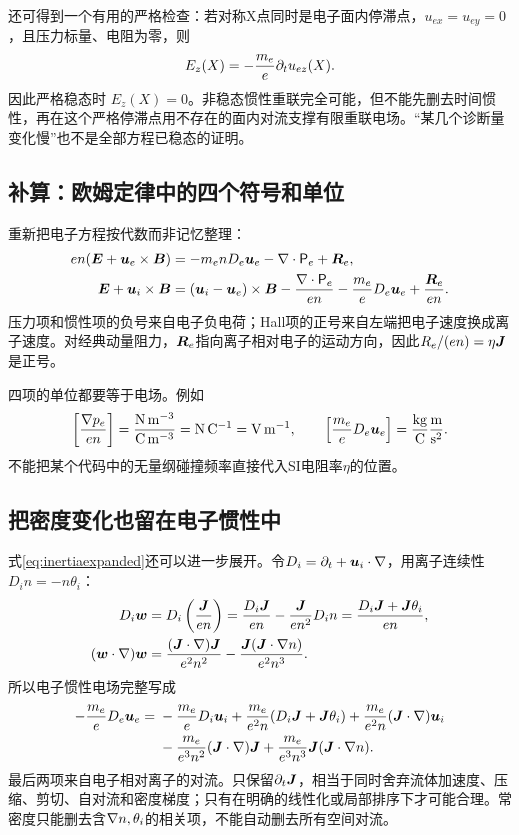 \documentclass[UTF8,a4paper,11pt,openany,fontset=fandol]{ctexbook}
\begin{document}
还可得到一个有用的严格检查：若对称X点同时是电子面内停滞点，$u_{ex}=u_{ey}=0$，且压力标量、电阻为零，则
\begin{equation}E_z(X)=-{m_e\over e}\partial_tu_{ez}(X).
\end{equation}
因此严格稳态时 $E_z(X)=0$。非稳态惯性重联完全可能，但不能先删去时间惯性，再在这个严格停滞点用不存在的面内对流支撑有限重联电场。“某几个诊断量变化慢”也不是全部方程已稳态的证明。

\subsection{补算：欧姆定律中的四个符号和单位}
重新把电子方程按代数而非记忆整理：
\begin{align}
 en(\bm{E}+\bm{u}_e\times\bm{B})
 &=-m_enD_e\bm{u}_e-\nabla\cdot\mathsf P_e+\bm{R}_e,\\
 \bm{E}+\bm{u}_i\times\bm{B}
 &=(\bm{u}_i-\bm{u}_e)\times\bm{B}
   -{\nabla\cdot\mathsf P_e\over en}-{m_e\over e}D_e\bm{u}_e
   +{\bm{R}_e\over en}.
\end{align}
压力项和惯性项的负号来自电子负电荷；Hall项的正号来自左端把电子速度换成离子速度。对经典动量阻力，$\bm{R}_e$指向离子相对电子的运动方向，因此$R_e/(en)=\eta\bm{J}$是正号。

四项的单位都要等于电场。例如
\begin{equation}
 \left[{\nabla p_e\over en}\right]
 ={{\rm N\,m^{-3}}\over{\rm C\,m^{-3}}}
 ={\rm N\,C^{-1}}={\rm V\,m^{-1}},\qquad
 \left[{m_e\over e}D_e\bm{u}_e\right]
 ={{\rm kg}\over{\rm C}}{{\rm m}\over{\rm s^2}}.
\end{equation}
不能把某个代码中的无量纲碰撞频率直接代入SI电阻率$\eta$的位置。

\subsection{把密度变化也留在电子惯性中}
式\eqref{eq:inertiaexpanded}还可以进一步展开。令$D_i=\partial_t+\bm{u}_i\cdot\nabla$，用离子连续性$D_in=-n\theta_i$：
\begin{align}
 D_i\bm{w}&=D_i\left({\bm{J}\over en}\right)
 ={D_i\bm{J}\over en}-{\bm{J}\over en^2}D_in
 ={D_i\bm{J}+\bm{J}\theta_i\over en},\\
 (\bm{w}\cdot\nabla)\bm{w}
 &={(\bm{J}\cdot\nabla)\bm{J}\over e^2n^2}
 -{\bm{J}(\bm{J}\cdot\nabla n)\over e^2n^3}.
\end{align}
所以电子惯性电场完整写成
\begin{align}
 -{m_e\over e}D_e\bm{u}_e
 ={}&-{m_e\over e}D_i\bm{u}_i
 +{m_e\over e^2n}(D_i\bm{J}+\bm{J}\theta_i)
 +{m_e\over e^2n}(\bm{J}\cdot\nabla)\bm{u}_i\\
 &-{m_e\over e^3n^2}(\bm{J}\cdot\nabla)\bm{J}
 +{m_e\over e^3n^3}\bm{J}(\bm{J}\cdot\nabla n).\nonumber
\end{align}
最后两项来自电子相对离子的对流。只保留$\partial_t\bm{J}$，相当于同时舍弃流体加速度、压缩、剪切、自对流和密度梯度；只有在明确的线性化或局部排序下才可能合理。常密度只能删去含$\nabla n,\theta_i$的相关项，不能自动删去所有空间对流。
\end{document}
